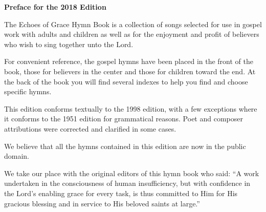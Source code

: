 \vspace*{1.5in}
\noindent\hfil{\textbf{Preface for the 2018 Edition}}\hfil

The {\textit{}Echoes of Grace Hymn Book} is a collection of songs selected for
use in gospel work with adults and children as well as for the enjoyment and
profit of believers who wish to sing together unto the Lord.

For convenient reference, the gospel hymns have been placed in the front of the
book, those for believers in the center and those for children toward the end.
At the back of the book you will find several indexes to help you find and
choose specific hymns.

This edition conforms textually to the 1998 edition, with a few exceptions
where it conforms to the 1951 edition for grammatical reasons.
\ifmetrical
Poet and composer attributions were corrected and clarified in some cases.
\fi

We believe that all the hymns contained in this edition are now in the public
domain.

We take our place with the original editors of this hymn book who said: ``A
work undertaken in the consciousness of human insufficiency, but with
confidence in the Lord's enabling grace for every task, is thus committed to
Him for His gracious blessing and in service to His beloved saints at large.''

\vspace*{\fill}

\afterpage{\null\newpage}

